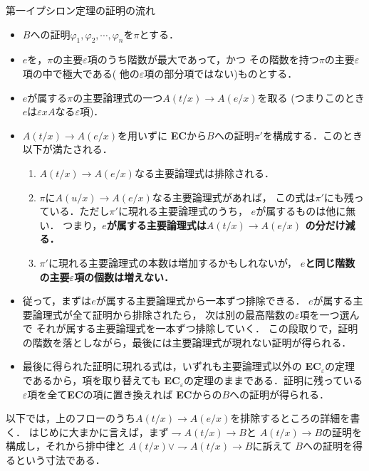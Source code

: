 	\begin{itembox}[l]{第一イプシロン定理の証明の流れ}
		\begin{itemize}
			\item $B$への証明$\varphi_{1},\varphi_{2},\cdots,\varphi_{n}$を$\pi$とする．
			\item $e$を，$\pi$の主要$\varepsilon$項のうち階数が最大であって，かつ
				その階数を持つ$\pi$の主要$\varepsilon$項の中で極大である(
				他の$\varepsilon$項の部分項ではない)ものとする．
			\item $e$が属する$\pi$の主要論理式の一つ$A(t/x) \rightarrow A(e/x)$を取る
				(つまりこのとき$e$は$\varepsilon x A$なる$\varepsilon$項)．
			\item $A(t/x) \rightarrow A(e/x)$を用いずに
				{\bf EC}から$B$への証明$\pi'$を構成する．このとき以下が満たされる．
				\begin{enumerate}
					\item $A(t/x) \rightarrow A(e/x)$なる主要論理式は排除される．
					\item $\pi$に$A(u/x) \rightarrow A(e/x)$なる主要論理式があれば，
						この式は$\pi'$にも残っている．ただし$\pi'$に現れる主要論理式のうち，
						$e$が属するものは他に無い．
						つまり，{\bf $e$が属する主要論理式は$A(t/x) \rightarrow A(e/x)$
						の分だけ減る．}
					\item $\pi'$に現れる主要論理式の本数は増加するかもしれないが，
						{\bf $e$と同じ階数の主要$\varepsilon$項の個数は増えない．}
				\end{enumerate}
			
			\item 従って，まずは$e$が属する主要論理式から一本ずつ排除できる．
				$e$が属する主要論理式が全て証明から排除されたら，
				次は別の最高階数の$\varepsilon$項を一つ選んで
				それが属する主要論理式を一本ずつ排除していく．
				この段取りで，証明の階数を落としながら，最後には主要論理式が現れない証明が得られる．
					
			\item 最後に得られた証明に現れる式は，いずれも主要論理式以外の
				{\bf EC}${}_{\varepsilon}$の定理であるから，項を取り替えても
				{\bf EC}${}_{\varepsilon}$の定理のままである．証明に残っている
				$\varepsilon$項を全て{\bf EC}の項に置き換えれば
				{\bf EC}からの$B$への証明が得られる．
		\end{itemize}
	\end{itembox}
	
	以下では，上のフローのうち$A(t/x) \rightarrow A(e/x)$を排除するところの詳細を書く．
	はじめに大まかに言えば，まず$\rightharpoondown A(t/x) \rightarrow B$と
	$A(t/x) \rightarrow B$の証明を構成し，それから排中律と
	$A(t/x) \vee \rightharpoondown A(t/x) \rightarrow B$に訴えて
	$B$への証明を得るという寸法である．
	
